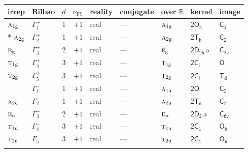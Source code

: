 \documentclass[10pt,a4paper]{article}
\makeatletter
\def\grouprule#1#2{\noalign{\marks\LTgroupmarks{\the\belowrulesep}\nobreak\vskip#1%
  \vskip\aboverulesep}\multispan\LT@cols\unskip{\leaders\hrule\@height#2\hfill\kern\z@}\cr
  \noalign{\penalty\LTrulebreak\vskip\belowrulesep\global\@lastruleclass\z@}}
\numberwithin{equation}{section}
\newcommand{\grp}[1]{\mathsf{#1}}
\newcommand{\irr}[1]{\text{\normalfont\scshape #1}}
\newcommand{\detbox}[1]{{\setlength{\fboxsep}{1pt}\fbox{#1}}}
\newcommand{\ptag}[1]{\mathrm{#1}}
\newcommand{\clsletter}[1]{\,{\scriptsize\color{black!55}#1}}
\newcommand{\fsind}{\nu_{\mathrm{FS}}}
\makeatother
\begin{document}
{\small\renewcommand{\arraystretch}{1.25}\setlength{\tabcolsep}{4pt}\begin{longtable}{@{}llrrlllll@{}}\toprule
irrep & Bilbao & $d$ & $\fsind$ & reality & conjugate & over $\mathbb{R}$ & kernel & image\\\midrule\endhead
\bottomrule\endfoot\endlastfoot
$\irr{a}_{1\ptag{g}}$ & $\Gamma_{1}^{+}$ & 1 & $+1$ & real & --- & $\irr{a}_{1\ptag{g}}$ & \href{2Oh.pdf}{$\grp{2O_{h}}$} & \href{../../../rotation/data/pdf/C1.pdf}{$\grp{C_{1}}$}\\*
$\irr{a}_{2\ptag{g}}$ & $\Gamma_{2}^{+}$ & 1 & $+1$ & real & --- & $\irr{a}_{2\ptag{g}}$ & \href{2Th.pdf}{$\grp{2T_{h}}$} & \href{../../../rotation/data/pdf/C2.pdf}{$\grp{C_{2}}$}\\
$\irr{e}_{\ptag{g}}$ & $\Gamma_{3}^{+}$ & 2 & $+1$ & real & --- & $\irr{e}_{\ptag{g}}$ & \href{2D2h.pdf}{$\grp{2D_{2h}}$}\clsletter{a} & \href{../../../rotation/data/pdf/C3v.pdf}{$\grp{C_{3v}}$}\\
$\irr{t}_{1\ptag{g}}$ & $\Gamma_{4}^{+}$ & 3 & $+1$ & real & --- & $\irr{t}_{1\ptag{g}}$ & \href{2S2.pdf}{$\grp{2C_{i}}$} & \href{../../../rotation/data/pdf/O.pdf}{$\grp{O}$}\\
$\irr{t}_{2\ptag{g}}$ & $\Gamma_{5}^{+}$ & 3 & $+1$ & real & --- & $\irr{t}_{2\ptag{g}}$ & \href{2S2.pdf}{$\grp{2C_{i}}$} & \href{../../../rotation/data/pdf/Td.pdf}{$\grp{T_{d}}$}\\
\detbox{$\irr{a}_{1\ptag{u}}$} & $\Gamma_{1}^{-}$ & 1 & $+1$ & real & --- & $\irr{a}_{1\ptag{u}}$ & \href{2O.pdf}{$\grp{2O}$} & \href{../../../rotation/data/pdf/C2.pdf}{$\grp{C_{2}}$}\\
$\irr{a}_{2\ptag{u}}$ & $\Gamma_{2}^{-}$ & 1 & $+1$ & real & --- & $\irr{a}_{2\ptag{u}}$ & \href{2Td.pdf}{$\grp{2T_{d}}$} & \href{../../../rotation/data/pdf/C2.pdf}{$\grp{C_{2}}$}\\
$\irr{e}_{\ptag{u}}$ & $\Gamma_{3}^{-}$ & 2 & $+1$ & real & --- & $\irr{e}_{\ptag{u}}$ & \href{2D2.pdf}{$\grp{2D_{2}}$}\clsletter{a} & \href{../../../rotation/data/pdf/C6v.pdf}{$\grp{C_{6v}}$}\\
$\irr{t}_{1\ptag{u}}$ & $\Gamma_{4}^{-}$ & 3 & $+1$ & real & --- & $\irr{t}_{1\ptag{u}}$ & \href{2C1.pdf}{$\grp{2C_{1}}$} & \href{../../../rotation/data/pdf/Oh.pdf}{$\grp{O_{h}}$}\\
$\irr{t}_{2\ptag{u}}$ & $\Gamma_{5}^{-}$ & 3 & $+1$ & real & --- & $\irr{t}_{2\ptag{u}}$ & \href{2C1.pdf}{$\grp{2C_{1}}$} & \href{../../../rotation/data/pdf/Oh.pdf}{$\grp{O_{h}}$}\\
\grouprule{0pt}{\lightrulewidth}

\end{longtable}}
\end{document}
